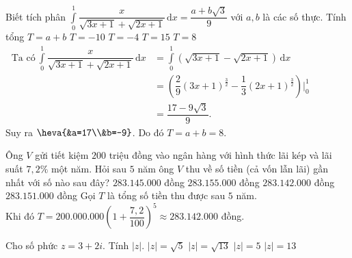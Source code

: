 \begin{ex}%
	Biết tích phân $\displaystyle\int\limits_0^1 \dfrac{x}{\sqrt{3x+1}+\sqrt{2x+1}} \mathrm{\, d}x =\dfrac{a+b\sqrt{3}}{9}$ với $a,b$ là các số thực. Tính tổng $T=a+b$
	\choice
	{$T=-10$}
	{$T=-4$}
	{$T=15$}
	{\True $T=8$}
	\loigiai
	{$\begin{aligned}\ \text{Ta có}\ 
		\displaystyle\int\limits_0^1 \dfrac{x}{\sqrt{3x+1}+\sqrt{2x+1}} \mathrm{\, d}x&=\displaystyle\int\limits_0^1 \left(\sqrt{3x+1}-\sqrt{2x+1}\right)\mathrm{\, d}x\\ &=\left(\dfrac{2}{9}(3x+1)^{\frac{3}{2}}-\dfrac{1}{3}(2x+1)^{\frac{3}{2}}\right)\bigg|_0^1\\
		&=\dfrac{17-9\sqrt{3}}{9}.\end{aligned}$\\
		Suy ra $\heva{&a=17\\&b=-9}$. Do đó $T=a+b=8$.}
\end{ex}
\begin{ex}%
	Ông $V$ gửi tiết kiệm $200$ triệu đồng vào ngân hàng với hình thức lãi kép và lãi suất $7{,}2\%$ một năm. Hỏi sau $5$ năm ông $V$ thu về số tiền (cả vốn lẫn lãi) gần nhất với số nào sau đây?
	\choice
	{$283.145.000$ đồng}
	{$283.155.000$ đồng}
	{\True $283.142.000$ đồng}
	{$283.151.000$ đồng}
	\loigiai
	{Gọi $T$ là tổng số tiền thu được sau $5$ năm. \\
		Khi đó $T=200.000.000\left(1+\dfrac{7{,}2}{100}\right)^5 \approx 283.142.000$ đồng.}
\end{ex}
\begin{ex}%
	Cho số phức $z=3+2i$. Tính $\left|z\right|$.
	\choice
	{$\left|z\right|=\sqrt 5$}
	{\True $\left|z\right|=\sqrt{13}$}
	{$\left|z\right|=5$}
	{$\left|z\right|=13$}
\end{ex}
